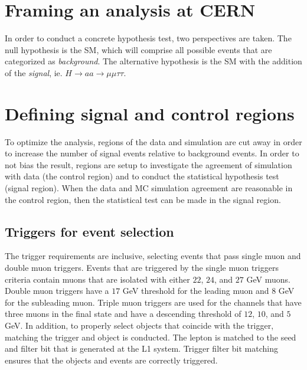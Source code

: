 \section{Framing an analysis at CERN}
In order to conduct a concrete hypothesis test, two perspectives are taken. 
The null hypothesis is the SM, which will comprise all possible events that are categorized as \textit{background}.
The alternative hypothesis is the SM with the addition of the \textit{signal}, ie. $H \rightarrow a a \rightarrow \mu\mu\tau\tau$. 

\section{Defining signal and control regions}
To optimize the analysis, regions of the data and simulation are cut away in order to increase the number of signal events relative to background events.  In order to not bias the result, regions are setup to investigate the agreement of simulation with data (the control region) and to conduct the statistical hypothesis test (signal region). When the data and MC simulation agreement are reasonable in the control region, then the statistical test can be made in the signal region.  

\subsection{Triggers for event selection}
\label{sec:trig}
The trigger requirements are inclusive, selecting events that pass single muon and double muon triggers. Events that are triggered by the single muon triggers criteria contain muons that are isolated with either $22$, $24$, and $27$ GeV muons. Double muon triggers have a $17$ GeV threshold for the leading muon and $8$ GeV for the subleading muon. Triple muon triggers are used for the channels that have three muons in the final state and have a descending threshold of $12$, $10$, and $5$ GeV. In addition, to properly select objects that coincide with the trigger, matching the trigger and object is conducted. The lepton is matched to the seed and filter bit that is generated at the L1 system. Trigger filter bit matching ensures that the objects and events are correctly triggered. 

